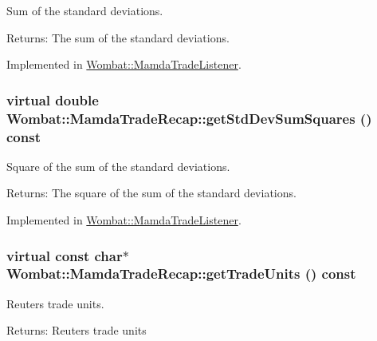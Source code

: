 Sum of the standard deviations. 

\begin{Desc}
\item[Returns:]The sum of the standard deviations. \end{Desc}


Implemented in \hyperlink{classWombat_1_1MamdaTradeListener_3fa0c29ee90e004a4f9d56dccb1f9d28}{Wombat::Mamda\-Trade\-Listener}.\hypertarget{classWombat_1_1MamdaTradeRecap_a2fb46ed6a57f14eb2a25ddbca0d902a}{
\subsubsection[getStdDevSumSquares]{\setlength{\rightskip}{0pt plus 5cm}virtual double Wombat::Mamda\-Trade\-Recap::get\-Std\-Dev\-Sum\-Squares () const}}
\label{classWombat_1_1MamdaTradeRecap_a2fb46ed6a57f14eb2a25ddbca0d902a}


Square of the sum of the standard deviations. 

\begin{Desc}
\item[Returns:]The square of the sum of the standard deviations. \end{Desc}


Implemented in \hyperlink{classWombat_1_1MamdaTradeListener_42d76e2ecd19afbf40e583c079221e02}{Wombat::Mamda\-Trade\-Listener}.\hypertarget{classWombat_1_1MamdaTradeRecap_f1d081fdecd01cd5e59210ff4be63d16}{
\subsubsection[getTradeUnits]{\setlength{\rightskip}{0pt plus 5cm}virtual const char$\ast$ Wombat::Mamda\-Trade\-Recap::get\-Trade\-Units () const}}
\label{classWombat_1_1MamdaTradeRecap_f1d081fdecd01cd5e59210ff4be63d16}


Reuters trade units. 

\begin{Desc}
\item[Returns:]Reuters trade units \end{Desc}


